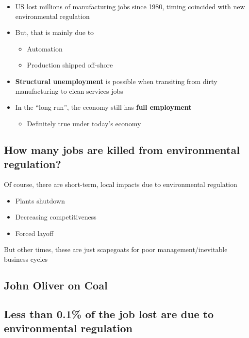 \documentclass[
]{article}
\providecommand{\tightlist}{%
  \setlength{\itemsep}{0pt}\setlength{\parskip}{0pt}}
\begin{document}
\begin{itemize}
\tightlist
\item
  US lost millions of manufacturing jobs since 1980, timing coincided
  with new environmental regulation
\item
  But, that is mainly due to

  \begin{itemize}
  \tightlist
  \item
    Automation
  \item
    Production shipped off-shore
  \end{itemize}
\item
  \textbf{Structural unemployment} is possible when transiting from
  dirty manufacturing to clean services jobs
\item
  In the ``long run'', the economy still has \textbf{full employment}

  \begin{itemize}
  \tightlist
  \item
    Definitely true under today's economy
  \end{itemize}
\end{itemize}

\hypertarget{how-many-jobs-are-killed-from-environmental-regulation}{%
\subsection{How many jobs are killed from environmental
regulation?}\label{how-many-jobs-are-killed-from-environmental-regulation}}

Of course, there are short-term, local impacts due to environmental
regulation

\begin{itemize}
\tightlist
\item
  Plants shutdown
\item
  Decreasing competitiveness
\item
  Forced layoff
\end{itemize}

But other times, these are just scapegoats for poor
management/inevitable business cycles

\hypertarget{john-oliver-on-coal}{%
\subsection{John Oliver on Coal}\label{john-oliver-on-coal}}

\hypertarget{less-than-0.1-of-the-job-lost-are-due-to-environmental-regulation}{%
\subsection{Less than 0.1\% of the job lost are due to environmental
regulation}\label{less-than-0.1-of-the-job-lost-are-due-to-environmental-regulation}}
\end{document}
